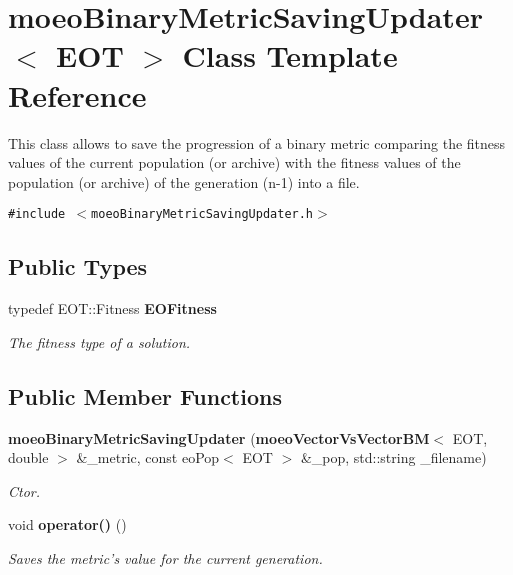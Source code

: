 \section{moeo\-Binary\-Metric\-Saving\-Updater$<$ EOT $>$ Class Template Reference}
\label{classmoeoBinaryMetricSavingUpdater}
This class allows to save the progression of a binary metric comparing the fitness values of the current population (or archive) with the fitness values of the population (or archive) of the generation (n-1) into a file.  


{\tt \#include $<$moeo\-Binary\-Metric\-Saving\-Updater.h$>$}

\subsection*{Public Types}
\begin{CompactItemize}
\item 
typedef EOT::Fitness {\bf EOFitness}\label{classmoeoBinaryMetricSavingUpdater_c22e390633d94bbf69309e8d0cae1f0a}

\begin{CompactList}\small\item\em The fitness type of a solution. \item\end{CompactList}\end{CompactItemize}
\subsection*{Public Member Functions}
\begin{CompactItemize}
\item 
{\bf moeo\-Binary\-Metric\-Saving\-Updater} ({\bf moeo\-Vector\-Vs\-Vector\-BM}$<$ EOT, double $>$ \&\_\-metric, const eo\-Pop$<$ EOT $>$ \&\_\-pop, std::string \_\-filename)
\begin{CompactList}\small\item\em Ctor. \item\end{CompactList}\item 
void {\bf operator()} ()\label{classmoeoBinaryMetricSavingUpdater_2d051d28def4cadf69957c8a21bf88dc}

\begin{CompactList}\small\item\em Saves the metric's value for the current generation. \item\end{CompactList}\end{CompactItemize}
